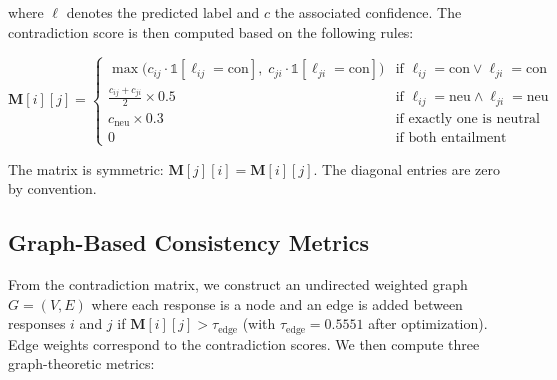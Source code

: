 \noindent
where $\ell$ denotes the predicted label and $c$ the associated confidence. The contradiction score is then computed based on the following rules:

\begin{equation}
    \mathbf{M}[i][j] = \begin{cases}
        \max\!\big(c_{ij} \cdot \mathbb{1}[\ell_{ij} = \text{con}], \; c_{ji} \cdot \mathbb{1}[\ell_{ji} = \text{con}]\big)
        & \text{if } \ell_{ij} = \text{con} \lor \ell_{ji} = \text{con} \\[6pt]
        \displaystyle\frac{c_{ij} + c_{ji}}{2} \times 0.5
        & \text{if } \ell_{ij} = \text{neu} \land \ell_{ji} = \text{neu} \\[6pt]
        c_{\text{neu}} \times 0.3
        & \text{if exactly one is neutral} \\[4pt]
        0 & \text{if both entailment}
    \end{cases}
    \label{eq:contradiction_score}
\end{equation}

\noindent
The matrix is symmetric: $\mathbf{M}[j][i] = \mathbf{M}[i][j]$. The diagonal entries are zero by convention.

\subsection{Graph-Based Consistency Metrics}

From the contradiction matrix, we construct an undirected weighted graph $G = (V, E)$ where each response is a node and an edge is added between responses $i$ and $j$ if $\mathbf{M}[i][j] > \tau_{\text{edge}}$ (with $\tau_{\text{edge}} = 0.5551$ after optimization). Edge weights correspond to the contradiction scores. We then compute three graph-theoretic metrics:

